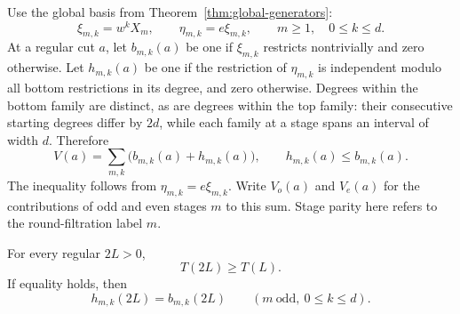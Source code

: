 Use the global basis from Theorem~\ref{thm:global-generators}:
\[
 \xi_{m,k}=w^kX_m,\qquad \eta_{m,k}=e\xi_{m,k},
 \qquad m\ge1,\quad 0\le k\le d.
\]
At a regular cut $a$, let $b_{m,k}(a)$ be one if $\xi_{m,k}$ restricts
nontrivially and zero otherwise. Let $h_{m,k}(a)$ be one if the
restriction of $\eta_{m,k}$ is independent modulo all bottom
restrictions in its degree, and zero otherwise. Degrees within the
bottom family are distinct, as are degrees within the top family:
their consecutive starting degrees differ by $2d$, while each family
at a stage spans an interval of width $d$. Therefore
\begin{equation}\label{act:visibility-count}
 V(a)=\sum_{m,k}\bigl(b_{m,k}(a)+h_{m,k}(a)\bigr),
 \qquad h_{m,k}(a)\le b_{m,k}(a).
\end{equation}
The inequality follows from $\eta_{m,k}=e\xi_{m,k}$. Write $V_o(a)$
and $V_e(a)$ for the contributions of odd and even stages $m$ to this
sum. Stage parity here refers to the round-filtration label $m$.

\begin{theorem}\label{thm:doubling}
For every regular $2L>0$,
\begin{equation}\label{act:doubling}
 T(2L)\ge T(L).
\end{equation}
If equality holds, then
\begin{equation}\label{act:odd-equality}
 h_{m,k}(2L)=b_{m,k}(2L)
 \qquad(m\ \text{odd},\ 0\le k\le d).
\end{equation}
\end{theorem}

